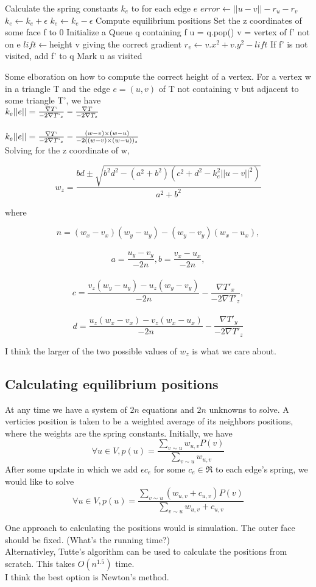 \documentclass{article}
\begin{document}
\begin{algorithmic}
\State Calculate the spring constants $k_e$ to for each edge $e$
				\State $error\gets ||u-v|| - r_u - r_v$
						\State $k_e\gets k_e + \epsilon$
						\State $k_e\gets k_e - \epsilon$
				\EndIf
		\EndFor
		\State Compute equilibrium positions
		\State Set the z coordinates of some face f to 0
		\State Initialize a Queue q containing f
				\State u = q.pop()
						\State v = vertex of f' not on e
						\State $lift\gets $height v giving the correct gradient
						\State $r_v\gets v.x^2 + v.y^2 - lift$
						\State If f' is not visited, add f' to q
				\EndFor
				\State Mark u as visited
		\EndWhile
\EndWhile
\end{algorithmic}	

Some elboration on how to compute the correct height of a vertex. For a vertex w in a triangle T and the edge $e = (u,v)$ of T not containing v but adjacent to some triangle T', we have
\\$k_e||e|| = \frac{\nabla T`}{-2\nabla T`_z} - \frac{\nabla T}{-2\nabla T_z}$\\
\\$k_e||e|| = \frac{\nabla T`}{-2\nabla T`_z} - \frac{(w-v)\times(w-u)}{-2((w-v)\times(w-u) )_z}$\\

Solving for the z coordinate of w,

$$w_z = \frac{bd \pm \sqrt{b^2d^2-(a^2+b^2)(c^2+d^2-k_e^2||u-v||^2)}}{a^2 + b^2}$$

where

$$n = (w_x - v_x)(w_y-u_y) - (w_y-v_y)(w_x-u_x),$$\\
$$a=\frac{u_y - v_y}{-2n}, b = \frac{v_x-u_x}{-2n},$$\\ 
$$c = \frac{v_z(w_y-u_y) - u_z(w_y-v_y)}{-2n} - \frac{\nabla T'_x}{-2\nabla T'_z},$$ \\
$$d = \frac{u_z(w_x-v_x) - v_z(w_x-u_x)}{-2n} - \frac{\nabla T'_y}{-2\nabla T'_z}$$

I think the larger of the two possible values of $w_z$ is what we care about. 

\subsection{Calculating equilibrium positions}

At any time we have a system of $2n$ equations and $2n$ unknowns to solve. A verticies position is taken to be a weighted average of its neighbors positions, where the weights are the spring constants. Initially, we have
$$ \forall u \in V, p(u) = \frac{\sum\limits_{v \sim u}{w_{u,v}P(v)}}{\sum\limits_{v \sim u}{w_{u,v}}}$$
After some update in which we add $\epsilon c_e$ for some $c_e \in \Re $ to each edge's spring, we would like to solve
$$ \forall u \in V, p(u) = \frac{\sum\limits_{v \sim u}{(w_{u,v}+c_{u,v})P(v)}}{\sum\limits_{v \sim u}{w_{u,v}+c_{u,v}}}$$

One approach to calculating the positions would is simulation. The outer face should be fixed. (What's the running time?)\\
Alternativley, Tutte's algorithm can be used to calculate the positions from scratch. This takes $O(n^{1.5})$ time. \\
I think the best option is Newton's method.\\
\end{document}
